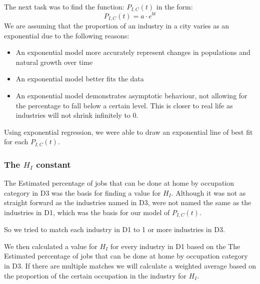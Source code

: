                 The next task was to find the function: $P_{I,C}(t)$ in the form:
                \begin{equation}
                P_{I,C}(t) = a \cdot e^{bt}
                \end{equation}
                We are assuming that the proportion of an industry in a city varies as an exponential due to the following reasons: 
                \begin{itemize}
                    \item An exponential model more accurately represent changes in populations and natural growth over time
                    \item An exponential model better fits the data
                    \item An exponential model demonstrates asymptotic behaviour, not allowing for the percentage to fall below a certain level. This is closer to real life as industries will not shrink infinitely to 0. 
                \end{itemize}
                Using exponential regression, we were able to draw an exponential line of best fit for each $P_{I,C}(t)$. 
                
                \subsubsection{The $H_{I}$ constant}
                The Estimated percentage of jobs that can be done at home by occupation category in D3 was the basis for finding a value for $H_{I}$. Although it was not as straight forward as the industries named in D3, were not named the same as the industries in D1, which was the basis for our model of $P_{I,C}(t)$.
                
                So we tried to match each industry in D1 to 1 or more industries in D3. 
                
                We then calculated a value for $H_I$ for every industry in D1 based on the The Estimated percentage of jobs that can be done at home by occupation category in D3. If there are multiple matches we will calculate a weighted average based on the proportion of the certain occupation in the industry for $H_I$.
                
